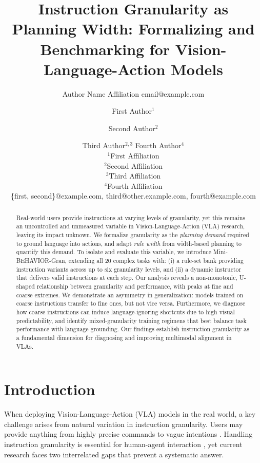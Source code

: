 \documentclass{article}
\title{Instruction Granularity as Planning Width: Formalizing and\\Benchmarking for Vision-Language-Action Models}
\author{
    Author Name
    \affiliations
    Affiliation
    \emails
    email@example.com
}
\author{
First Author$^1$
\and
Second Author$^2$\and
Third Author$^{2,3}$\And
Fourth Author$^4$\\
\affiliations
$^1$First Affiliation\\
$^2$Second Affiliation\\
$^3$Third Affiliation\\
$^4$Fourth Affiliation\\
\emails
\{first, second\}@example.com,
third@other.example.com,
fourth@example.com
}
\begin{document}
\maketitle

\begin{abstract}
    Real-world users provide instructions at varying levels of granularity, yet this remains an uncontrolled and unmeasured variable in Vision-Language-Action (VLA) research, leaving its impact unknown. 
    We formalize granularity as the \emph{planning demand} required to ground language into actions, and adapt \emph{rule width} from width-based planning to quantify this demand. To isolate and evaluate this variable, we introduce Mini-BEHAVIOR-Gran, extending all 20 complex tasks with: (i) a rule-set bank providing instruction variants across up to six granularity levels, and (ii) a dynamic instructor that delivers valid instructions at each step. Our analysis reveals a non-monotonic, U-shaped relationship between granularity and performance, with peaks at fine and coarse extremes. We demonstrate an asymmetry in generalization: models trained on coarse instructions transfer to fine ones, but not vice versa. Furthermore, we diagnose how coarse instructions can induce language-ignoring shortcuts due to high visual predictability, and identify mixed-granularity training regimens that best balance task performance with language grounding. Our findings establish instruction granularity as a fundamental dimension for diagnosing and improving multimodal alignment in VLAs.
\end{abstract}

\section{Introduction}
\label{sec:introduction}

When deploying Vision-Language-Action (VLA) models in the real world, a key challenge arises from natural variation in instruction granularity. Users may provide anything from highly precise commands to vague intentions \cite{clark1996using}. Handling instruction granularity is essential for human-agent interaction \cite{donalddesign2002}, yet current research faces two interrelated gaps that prevent a systematic answer.
\end{document}
